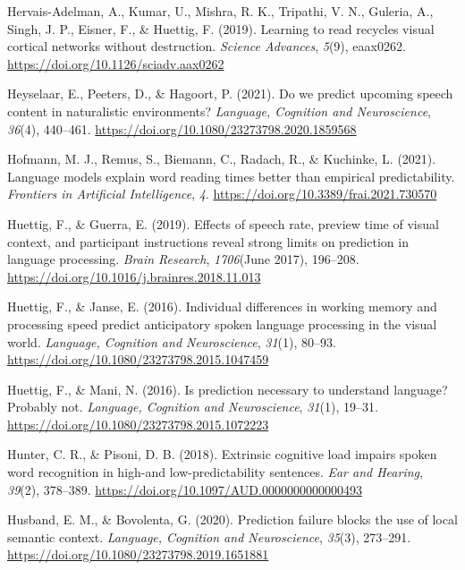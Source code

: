 \documentclass[a4paper, nobind]{templates/ociamthesis}
\newlength{\cslhangindent}
\newenvironment{CSLReferences}[2] %
 {%
  \setlength{\parindent}{0pt}
  \ifodd #1
  \let\oldpar\par
  \def\par{\hangindent=\cslhangindent\oldpar}
  \fi
  \setlength{\parskip}{1mm}
  \setlength{\baselineskip}{6mm}
 }%
 {}
\begin{document}
\begin{CSLReferences}{1}{0}
\leavevmode{}%
Hervais-Adelman, A., Kumar, U., Mishra, R. K., Tripathi, V. N., Guleria, A., Singh, J. P., Eisner, F., \& Huettig, F. (2019). Learning to read recycles visual cortical networks without destruction. \emph{Science Advances}, \emph{5}(9), eaax0262. \url{https://doi.org/10.1126/sciadv.aax0262}

\leavevmode{}%
Heyselaar, E., Peeters, D., \& Hagoort, P. (2021). {Do we predict upcoming speech content in naturalistic environments?} \emph{Language, Cognition and Neuroscience}, \emph{36}(4), 440--461. \url{https://doi.org/10.1080/23273798.2020.1859568}

\leavevmode{}%
Hofmann, M. J., Remus, S., Biemann, C., Radach, R., \& Kuchinke, L. (2021). Language models explain word reading times better than empirical predictability. \emph{Frontiers in Artificial Intelligence}, \emph{4}. \url{https://doi.org/10.3389/frai.2021.730570}

\leavevmode{}%
Huettig, F., \& Guerra, E. (2019). {Effects of speech rate, preview time of visual context, and participant instructions reveal strong limits on prediction in language processing}. \emph{Brain Research}, \emph{1706}(June 2017), 196--208. \url{https://doi.org/10.1016/j.brainres.2018.11.013}

\leavevmode{}%
Huettig, F., \& Janse, E. (2016). Individual differences in working memory and processing speed predict anticipatory spoken language processing in the visual world. \emph{Language, Cognition and Neuroscience}, \emph{31}(1), 80--93. \url{https://doi.org/10.1080/23273798.2015.1047459}

\leavevmode{}%
Huettig, F., \& Mani, N. (2016). Is prediction necessary to understand language? Probably not. \emph{Language, Cognition and Neuroscience}, \emph{31}(1), 19--31. \url{https://doi.org/10.1080/23273798.2015.1072223}

\leavevmode{}%
Hunter, C. R., \& Pisoni, D. B. (2018). {Extrinsic cognitive load impairs spoken word recognition in high-and low-predictability sentences}. \emph{Ear and Hearing}, \emph{39}(2), 378--389. \url{https://doi.org/10.1097/AUD.0000000000000493}

\leavevmode{}%
Husband, E. M., \& Bovolenta, G. (2020). {Prediction failure blocks the use of local semantic context}. \emph{Language, Cognition and Neuroscience}, \emph{35}(3), 273--291. \url{https://doi.org/10.1080/23273798.2019.1651881}


\end{CSLReferences}
\end{document}
